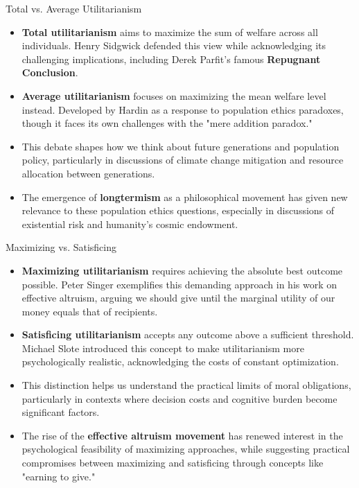 \documentclass[aspectratio=169]{beamer}
\begin{document}
 \begin{frame}{Total vs. Average Utilitarianism}
    \begin{itemize}
        \item \textbf{Total utilitarianism} aims to maximize the sum of welfare across all individuals. Henry Sidgwick defended this view while acknowledging its challenging implications, including Derek Parfit's famous \textbf{Repugnant Conclusion}.
        
        \item \textbf{Average utilitarianism} focuses on maximizing the mean welfare level instead. Developed by Hardin as a response to population ethics paradoxes, though it faces its own challenges with the "mere addition paradox."
        
        \item This debate shapes how we think about future generations and population policy, particularly in discussions of climate change mitigation and resource allocation between generations.
        
        \item The emergence of \textbf{longtermism} as a philosophical movement has given new relevance to these population ethics questions, especially in discussions of existential risk and humanity's cosmic endowment.
    \end{itemize}
 \end{frame}
 
 \begin{frame}{Maximizing vs. Satisficing}
    \begin{itemize}
        \item \textbf{Maximizing utilitarianism} requires achieving the absolute best outcome possible. Peter Singer exemplifies this demanding approach in his work on effective altruism, arguing we should give until the marginal utility of our money equals that of recipients.
        
        \item \textbf{Satisficing utilitarianism} accepts any outcome above a sufficient threshold. Michael Slote introduced this concept to make utilitarianism more psychologically realistic, acknowledging the costs of constant optimization.
        
        \item This distinction helps us understand the practical limits of moral obligations, particularly in contexts where decision costs and cognitive burden become significant factors.
        
        \item The rise of the \textbf{effective altruism movement} has renewed interest in the psychological feasibility of maximizing approaches, while suggesting practical compromises between maximizing and satisficing through concepts like "earning to give."
    \end{itemize}
 \end{frame}
\end{document}
